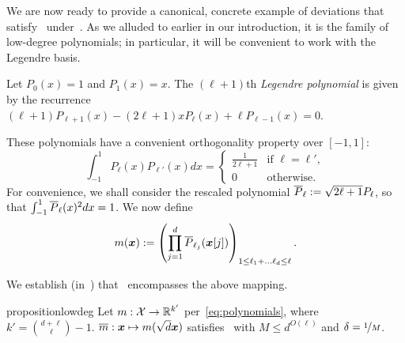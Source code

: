 We are now ready to provide a canonical, concrete example of deviations that satisfy~ under~. As we alluded to earlier in our introduction, it is the family of low-degree polynomials; in particular, it will be convenient to work with the Legendre basis.

\begin{definition}
    \label{def:polys}
    Let $P_0(x) = 1$ and $P_1(x) = x$. The $(\ell+1)$th \emph{Legendre polynomial} is given by the recurrence $(\ell + 1) P_{\ell + 1}(x) - (2\ell+1) x P_\ell(x) + \ell P_{\ell - 1}(x) = 0$.
\end{definition}

These polynomials have a convenient orthogonality property over $[-1, 1]$:
\begin{equation}
    \label{eq:orthog}
    \int_{-1}^1 P_{\ell}(x) P_{\ell'}(x) dx = 
    \begin{cases}
        \frac{1}{2\ell + 1} & \text{if } \ell = \ell',\\
        0 & \text{otherwise}.
    \end{cases}
\end{equation}
For convenience, we shall consider the rescaled polynomial $\overline{P}_\ell := \sqrt{2\ell + 1} P_{\ell}$, so that $\int_{-1}^1 \overline{P}_\ell(x)^2 dx = 1$. We now define
\begin{equation}
    \label{eq:polynomials}
    m({\bm{x}}) := \left( \prod_{j=1}^d \overline{P}_{\ell_j}({\bm{x}}[j]) \right)_{ 1 \leq \ell_1 + \dots \ell_d \leq \ell}.
\end{equation}

We establish (in~) that~ encompasses the above mapping.

\begin{restatable}{proposition}{lowdeg}
    \label{lemma:lowdeg}
    Let $m : {\mathcal{X}} \to \mathbb R^{k'}$ per~\eqref{eq:polynomials}, where $k' = \binom{d + \ell}{\ell} - 1$. $\overline{m} : {\bm{x}} \mapsto m( \sqrt{d} {\bm{x}})$ satisfies~ with $M \leq d^{O(\ell)}$  and $\delta = \nicefrac{1}{M}$.
\end{restatable}